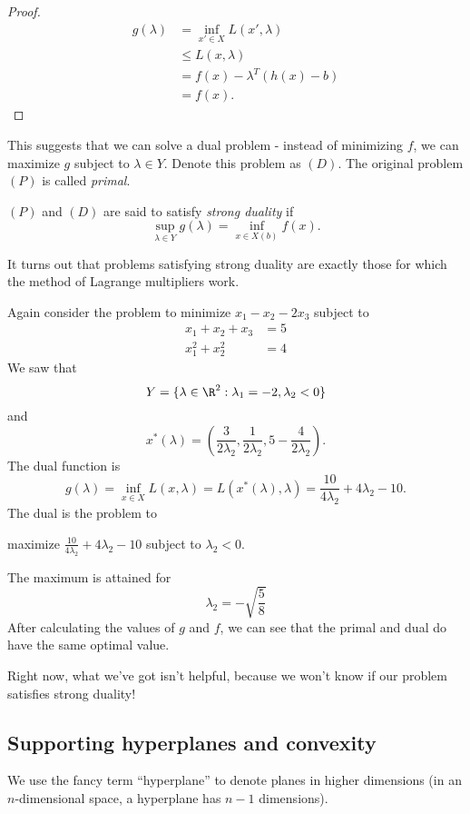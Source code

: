 \documentclass[a4paper]{article}
\begin{document}
\begin{proof}
  \begin{align*}
    g(\lambda) &= \inf_{x'\in X}L(x', \lambda)\\
    &\leq L(x, \lambda)\\
    &= f(x) - \lambda^T (h(x) - b)\\
    &= f(x).
  \end{align*}
\end{proof}

This suggests that we can solve a dual problem - instead of minimizing $f$, we can maximize $g$ subject to $\lambda\in Y$. Denote this problem as $(D)$. The original problem $(P)$ is called \emph{primal}.

\begin{defi}
  $(P)$ and $(D)$ are said to satisfy \emph{strong duality} if
  \[
    \sup_{\lambda\in Y}g(\lambda) = \inf_{x\in X(b)}f(x).
  \]
\end{defi}
It turns out that problems satisfying strong duality are exactly those for which the method of Lagrange multipliers work.

\begin{eg}
  Again consider the problem to minimize $x_1 - x_2 - 2x_3$ subject to
  \begin{align*}
    x_1 + x_2 + x_3 &= 5\\
    x_1^2 + x_2^2 &= 4
  \end{align*}
  We saw that
  \[
    Y = \{\lambda\in \R^2: \lambda_1 = -2, \lambda_2 < 0\}
  \]
  and
  \[
    x^*(\lambda) = \left(\frac{3}{2\lambda_2}, \frac{1}{2\lambda_2}, 5 - \frac{4}{2\lambda_2}\right).
  \]
  The dual function is
  \[
    g(\lambda) = \inf_{x\in X} L(x, \lambda) = L(x^*(\lambda), \lambda) = \frac{10}{4\lambda_2} + 4\lambda_2 - 10.
  \]
  The dual is the problem to
  \begin{center}
    maximize $\frac{10}{4\lambda_2} + 4\lambda_2 - 10$ subject to $\lambda_2 < 0$.
  \end{center}
  The maximum is attained for
  \[
    \lambda_2 = -\sqrt{\frac{5}{8}}
  \]
  After calculating the values of $g$ and $f$, we can see that the primal and dual do have the same optimal value.
\end{eg}

Right now, what we've got isn't helpful, because we won't know if our problem satisfies strong duality!

\subsection{Supporting hyperplanes and convexity}
We use the fancy term ``hyperplane'' to denote planes in higher dimensions (in an $n$-dimensional space, a hyperplane has $n - 1$ dimensions).
\end{document}
